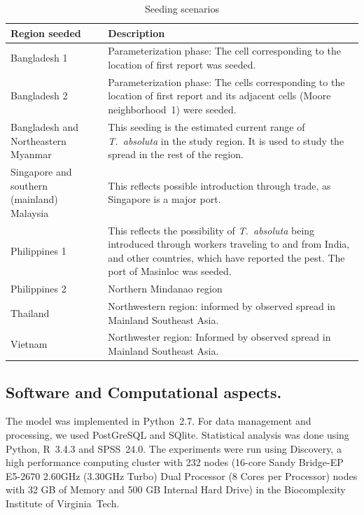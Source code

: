 \documentclass[10pt]{article}
\theoremstyle{definition}
\newcommand{\tuta}{\emph{T.~absoluta}}
\begin{document}
\begin{table}[ht]
    \caption{Seeding scenarios\label{tab:seeds}}
    \centering
    \small
    \begin{tabular}{p{4cm} p{10cm}}
    	\hline
    	Region seeded & Description \\
    	\hline
    	\hline
        Bangladesh 1 & Parameterization phase: The cell corresponding to the location of first
        report was seeded. \\
        Bangladesh 2 & Parameterization phase: The cells corresponding to the location of first
        report and its adjacent cells (Moore neighborhood~1) were seeded. \\
    	\hline
	Bangladesh and Northeastern Myanmar & This seeding is the estimated
	current range of \tuta{} in the study region. It is used to study
	the spread in the rest of the region.\\
    	\hline
    	Singapore and southern (mainland) Malaysia & This reflects possible introduction through trade, as Singapore is a major port.\\
    	\hline
    	Philippines 1 & This reflects the possibility of \tuta{} being
        introduced through workers traveling to and from India, and other
        countries, which have reported the pest. The port of Masinloc was
        seeded.\\
    	Philippines 2 & Northern Mindanao region\\
    	Thailand & Northwestern region: informed by observed spread in
        Mainland Southeast Asia.\\
    	Vietnam & Northwester region: Informed by observed spread in
        Mainland Southeast Asia.\\
    	\hline
    	\end{tabular}
\end{table}
\subsection{Software and Computational aspects.} The model was implemented
in Python~2.7. For data management and processing, we used PostGreSQL and
SQlite.  Statistical analysis was done using Python, R~3.4.3 and SPSS~24.0.
The experiments were run using Discovery, a high performance computing
cluster with 232 nodes (16-core Sandy Bridge-EP E5-2670 2.60GHz (3.30GHz
Turbo) Dual Processor (8 Cores per Processor) nodes with 32 GB of Memory
and 500 GB Internal Hard Drive) in the Biocomplexity Institute of Virginia~Tech.
\end{document}
